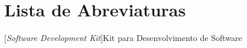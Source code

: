 \chapter{Lista de Abreviaturas}

\begin{acronym}

[\textit{Software Development Kit}]{Kit para Desenvolvimento de Software} %

\end{acronym}

